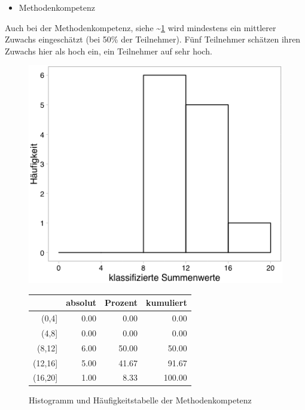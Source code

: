\documentclass[12pt, bibliography=totoc]{scrartcl}
\begin{document}
\begin{itemize}
\tightlist
\item
  Methodenkompetenz
\end{itemize}

Auch bei der Methodenkompetenz, siehe \textasciitilde{}\ref{fig:MK} wird
mindestens ein mittlerer Zuwachs eingeschätzt (bei 50\% der Teilnehmer).
Fünf Teilnehmer schätzen ihren Zuwachs hier als hoch ein, ein Teilnehmer
auf sehr hoch.

\begin{figure}[H]
\begin{minipage}{.5\linewidth}
\includegraphics[width=0.8\linewidth]{Anhang/MKHistnn.png}


\end{minipage}
\begin{minipage}{.5\linewidth}
\centering
\raisebox{\depth}
{\begin{tabular}{rrrr}
  \hline
 & absolut & Prozent & kumuliert \\ 
  \hline
(0,4] & 0.00 & 0.00 & 0.00 \\ 
  (4,8] & 0.00 & 0.00 & 0.00 \\ 
  (8,12] & 6.00 & 50.00 & 50.00 \\ 
  (12,16] & 5.00 & 41.67 & 91.67 \\ 
  (16,20] & 1.00 & 8.33 & 100.00 \\ 
   \hline
\end{tabular}

}
\label{tab:defis}
\end{minipage}
\caption{Histogramm und Häufigkeitstabelle der Methodenkompetenz}
\label{fig:MK}
\end{figure}
\end{document}
